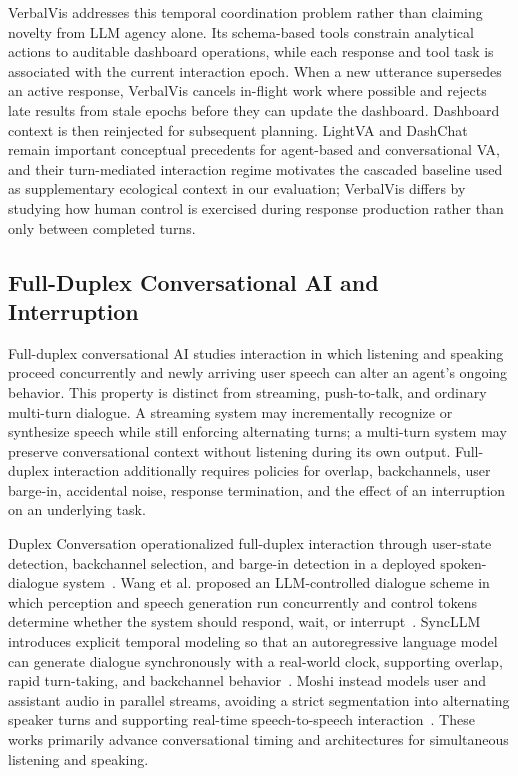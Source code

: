 \documentclass[journal]{IEEEtran}
\begin{document}
VerbalVis addresses this temporal coordination problem rather than claiming novelty from LLM agency alone. Its schema-based tools constrain analytical actions to auditable dashboard operations, while each response and tool task is associated with the current interaction epoch. When a new utterance supersedes an active response, VerbalVis cancels in-flight work where possible and rejects late results from stale epochs before they can update the dashboard. Dashboard context is then reinjected for subsequent planning. LightVA and DashChat remain important conceptual precedents for agent-based and conversational VA, and their turn-mediated interaction regime motivates the cascaded baseline used as supplementary ecological context in our evaluation; VerbalVis differs by studying how human control is exercised during response production rather than only between completed turns.

\subsection{Full-Duplex Conversational AI and Interruption}
\label{sec:rw-full-duplex}

Full-duplex conversational AI studies interaction in which listening and speaking proceed concurrently and newly arriving user speech can alter an agent's ongoing behavior. This property is distinct from streaming, push-to-talk, and ordinary multi-turn dialogue. A streaming system may incrementally recognize or synthesize speech while still enforcing alternating turns; a multi-turn system may preserve conversational context without listening during its own output. Full-duplex interaction additionally requires policies for overlap, backchannels, user barge-in, accidental noise, response termination, and the effect of an interruption on an underlying task.

Duplex Conversation operationalized full-duplex interaction through user-state detection, backchannel selection, and barge-in detection in a deployed spoken-dialogue system~\cite{lin2022duplex}. Wang et al. proposed an LLM-controlled dialogue scheme in which perception and speech generation run concurrently and control tokens determine whether the system should respond, wait, or interrupt~\cite{wang2024fullduplex}. SyncLLM introduces explicit temporal modeling so that an autoregressive language model can generate dialogue synchronously with a real-world clock, supporting overlap, rapid turn-taking, and backchannel behavior~\cite{veluri2024syncllm}. Moshi instead models user and assistant audio in parallel streams, avoiding a strict segmentation into alternating speaker turns and supporting real-time speech-to-speech interaction~\cite{defossez2024moshi}. These works primarily advance conversational timing and architectures for simultaneous listening and speaking.
\end{document}
